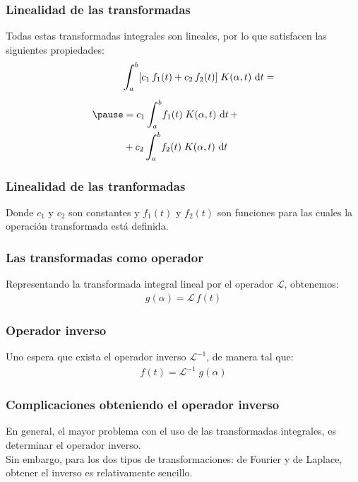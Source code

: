 \documentclass[12pt]{beamer}
\begin{document}
\begin{frame}
\frametitle{Linealidad de las transformadas}
Todas estas transformadas integrales son lineales, por lo que satisfacen las siguientes propiedades:
\pause
\begin{eqnarray}
\begin{aligned}[b]
&\scaleint{6ex}_{\bs a}^{b} [ c_{1} \, f_{1} (t) + c_{2} \, f_{2} (t)] \; K(\alpha, t) \, \dd{t} = \\[0.5em] \pause
&= c_{1} \, \scaleint{6ex}_{\bs a}^{b} f_{1} (t) \; K (\alpha, t) \, \dd{t} + \\
&+ c_{2} \, \scaleint{6ex}_{\bs a}^{b} f_{2} (t) \; K (\alpha, t) \, \dd{t}
\end{aligned}
\label{eq:ecuacion_15_08} 
\end{eqnarray}
\end{frame}
\begin{frame}
\frametitle{Linealidad de las tranformadas}
Donde $c_{1}$ y $c_{2}$ son constantes y $f_{1} (t)$ y $f_{2} (t)$ son funciones para las cuales la operación transformada está definida.
\end{frame}
\begin{frame}
\frametitle{Las transformadas como operador}
Representando la transformada integral lineal por el operador $\mathcal{L}$, obtenemos:
\pause
\begin{align}
g (\alpha) = \mathcal{L} \, f (t)
\label{eq:ecuacion_15_10}
\end{align}
\end{frame}
\begin{frame}
\frametitle{Operador inverso}
Uno espera que exista el operador inverso $\mathcal{L}^{-1}$, de manera tal que:
\pause
\begin{align}
f (t) = \mathcal{L}^{-1}  \; g (\alpha)
\label{eq:ecuacion_15_11}
\end{align}
\end{frame}
\begin{frame}
\frametitle{Complicaciones obteniendo el operador inverso}
En general, el mayor problema con el uso de las transformadas integrales, es determinar el operador inverso.
\\
\bigskip
\pause
Sin embargo, para los dos tipos de transformaciones: de Fourier y de Laplace, obtener el inverso es relativamente sencillo.
\end{frame}
\end{document}
